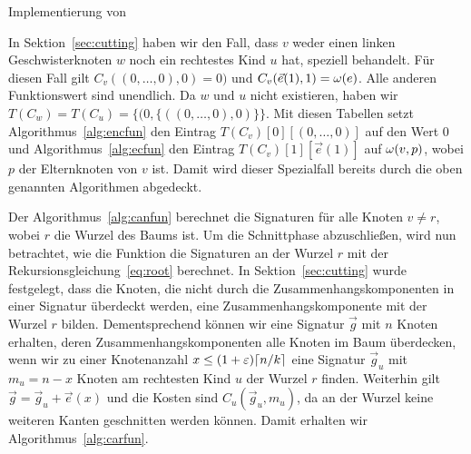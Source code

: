 \begin{algorithm}
    \caption{Implementierung von }\label{alg:ecfun}
    \begin{algorithmic}[1]
             
                \Return
            \Else
            \EndIf
        \EndFunction
    \end{algorithmic}
\end{algorithm}

\begin{rem}
    In Sektion~\ref{sec:cutting} haben wir den Fall, dass $v$ weder einen linken Geschwisterknoten $w$ noch ein rechtestes Kind $u$ hat, speziell behandelt.
    Für diesen Fall gilt $C_v((0,\ldots,0), 0) = 0)$ und $C_v(\vec{e}(1), 1) = \omega(e)$. 
    Alle anderen Funktionswert sind unendlich.
    Da $w$ und $u$ nicht existieren, haben wir $T(C_w) = T(C_u) = \{(0, \{((0, \ldots, 0), 0)\} \}$.
    Mit diesen Tabellen setzt Algorithmus~\ref{alg:encfun} den Eintrag $T(C_v)[0][(0,\ldots, 0)]$ auf den Wert $0$ und Algorithmus~\ref{alg:ecfun} den Eintrag $T(C_v)[1][\vec{e}(1)]$ auf $\omega(v,p)$, wobei $p$ der Elternknoten von $v$ ist.
    Damit wird dieser Spezialfall bereits durch die oben genannten Algorithmen abgedeckt.
\end{rem}

Der Algorithmus~\ref{alg:canfun} berechnet die Signaturen für alle Knoten $v \neq r$, wobei $r$ die Wurzel des Baums ist.
Um die Schnittphase abzuschließen, wird nun betrachtet, wie die Funktion \carfun{} die Signaturen an der Wurzel $r$ mit der Rekursionsgleichung~\eqref{eq:root} berechnet.
In Sektion~\ref{sec:cutting} wurde festgelegt, dass die Knoten, die nicht durch die Zusammenhangskomponenten in einer Signatur überdeckt werden, eine Zusammenhangskomponente mit der Wurzel $r$ bilden.
Dementsprechend können wir eine Signatur $\vec{g}$ mit $n$ Knoten erhalten, deren Zusammenhangskomponenten alle Knoten im Baum überdecken, wenn wir zu einer Knotenanzahl $x \leq (1+\varepsilon)\lceil n/k\rceil$ eine Signatur $\vec{g}_u$ mit $m_u = n - x$ Knoten am rechtesten Kind $u$ der Wurzel $r$ finden.
Weiterhin gilt $\vec{g} = \vec{g}_u + \vec{e}(x)$ und die Kosten sind $C_u(\vec{g}_u, m_u)$, da an der Wurzel keine weiteren Kanten geschnitten werden können.
Damit erhalten wir Algorithmus~\ref{alg:carfun}.

